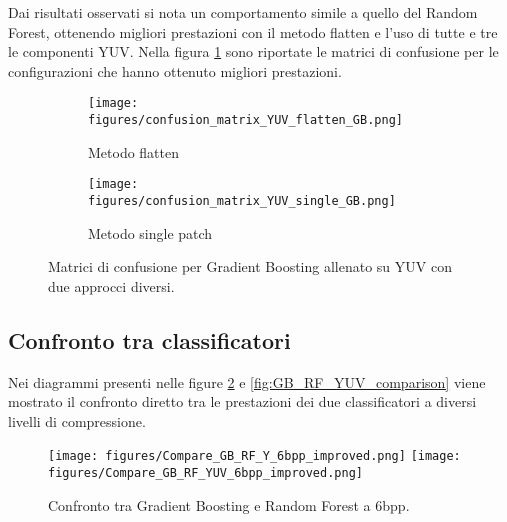 Dai risultati osservati si nota un comportamento simile a quello del Random Forest, ottenendo migliori prestazioni con il metodo flatten e l'uso di tutte e tre le componenti YUV.
Nella figura \ref{fig:GB_YUV_confusion} sono riportate le matrici di confusione per le configurazioni che hanno ottenuto migliori prestazioni.
\begin{figure}[H]
    \centering
    \begin{subfigure}[b]{0.45\textwidth}
        \centering
        \texttt{[image: figures/confusion\_matrix\_YUV\_flatten\_GB.png]}
        \caption{Metodo flatten}
    \end{subfigure}
    \hfill
    \begin{subfigure}[b]{0.45\textwidth}
        \centering
        \texttt{[image: figures/confusion\_matrix\_YUV\_single\_GB.png]}
        \caption{Metodo single patch}
    \end{subfigure}
    \caption{Matrici di confusione per Gradient Boosting allenato su YUV con due approcci diversi.}
    \label{fig:GB_YUV_confusion}
\end{figure}
\subsection{Confronto tra classificatori}
Nei diagrammi presenti nelle figure \ref{fig:GB_RF_Y_comparison} e \ref{fig:GB_RF_YUV_comparison} viene mostrato il confronto diretto tra le prestazioni dei due classificatori a diversi livelli di compressione.
\begin{figure}[H]
    \centering
    \texttt{[image: figures/Compare\_GB\_RF\_Y\_6bpp\_improved.png]}
    \texttt{[image: figures/Compare\_GB\_RF\_YUV\_6bpp\_improved.png]}
    \caption{Confronto tra Gradient Boosting e Random Forest a 6bpp.}
    \label{fig:GB_RF_Y_comparison}
\end{figure}

